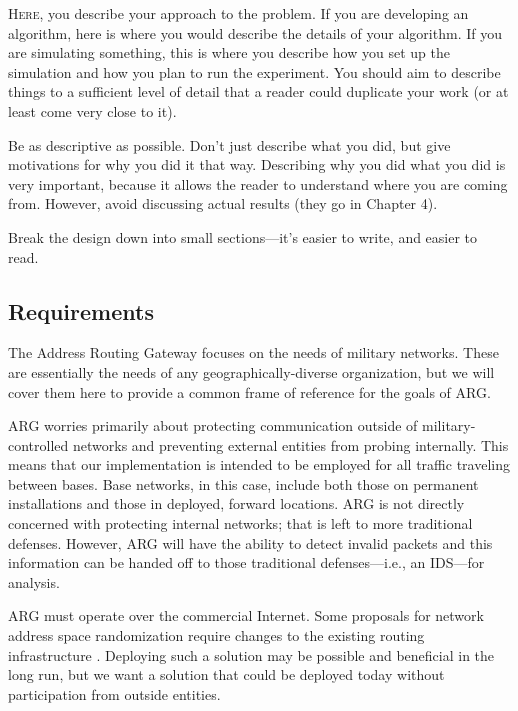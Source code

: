 
\lettrine{H}{ere}, you describe your approach to the problem. If you are developing an
algorithm, here is where you would describe the details of your algorithm. If you are
simulating something, this is where you describe how you set up the simulation and
how you plan to run the experiment. You should aim to describe things to a sufficient
level of detail that a reader could duplicate your work (or at least come very close to
it).

\par Be as descriptive as possible. Don’t just describe what you did, but give motivations
for why you did it that way. Describing why you did what you did is very important,
because it allows the reader to understand where you are coming from. However,
avoid discussing actual results (they go in Chapter 4).

\par Break the design down into small sections—it’s easier to write, and easier to read.

\subsection{Requirements}
\par The Address Routing Gateway focuses on the needs of military networks. These are essentially the needs of any geographically-diverse organization, but we will cover them here to provide a common frame of reference for the goals of ARG. 

\par ARG worries primarily about protecting communication outside of military-controlled networks and preventing external entities from probing internally. This means that our implementation is intended to be employed for all traffic traveling between bases. Base networks, in this case, include both those on permanent installations and those in deployed, forward locations. ARG is not directly concerned with protecting internal networks; that is left to more traditional defenses. However, ARG will have the ability to detect invalid packets and this information can be handed off to those traditional defenses---i.e., an IDS---for analysis.

\par ARG must operate over the commercial Internet. Some proposals for network address space randomization require changes to the existing routing infrastructure \cite{CONTRA}. Deploying such a solution may be possible and beneficial in the long run, but we want a solution that could be deployed today without participation from outside entities.

